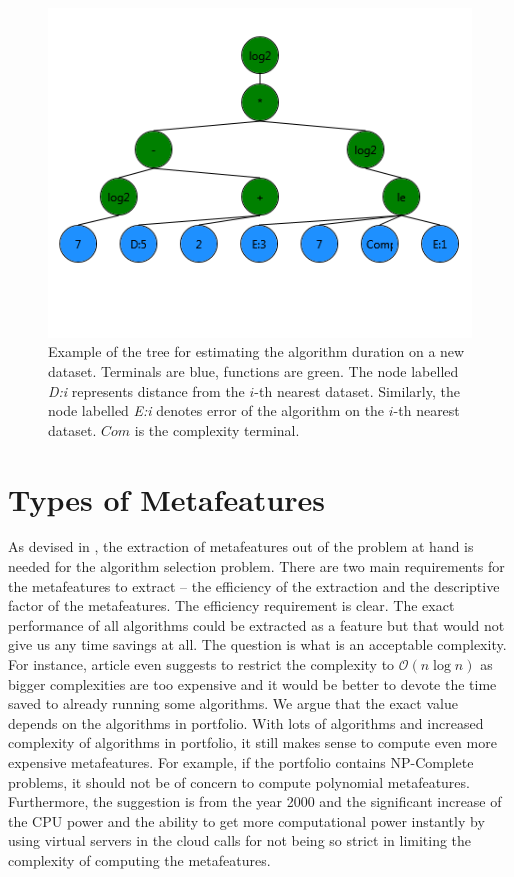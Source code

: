 \begin{figure}
	\includegraphics[width=14cm]{Images/masterThesisTree.png}
	\centering
	\caption{Example of the tree for estimating the algorithm duration on a new dataset. Terminals are blue, functions are green. The node labelled \emph{D:i} represents distance from the $i$-th nearest dataset. Similarly, the node labelled \emph{E:i} denotes error of the algorithm on the $i$-th nearest dataset. $Com$ is the complexity terminal. }
	\label{fig:masterThesisTree}	
\end{figure}

\section{Types of Metafeatures}
As devised in \cite{1976RiceAlgorithmSelectionProblem}, the extraction of metafeatures out of the problem at hand is needed for the algorithm selection problem. There are two main requirements for the metafeatures to extract -- the efficiency of the extraction and the descriptive factor of the metafeatures. The efficiency requirement is clear. The exact performance of all algorithms could be extracted as a feature but that would not give us any time savings at all. The question is what is an acceptable complexity. For instance, article \cite{metafeaturesNlogn} even suggests to restrict the complexity to $\mathcal{O}(n\log n)$ as bigger complexities are too expensive and it would be better to devote the time saved to already running some algorithms. We argue that the exact value depends on the algorithms in portfolio. With lots of algorithms and increased complexity of algorithms in portfolio, it still makes sense to compute even more expensive metafeatures. For example, if the portfolio contains NP-Complete problems, it should not be of concern to compute polynomial metafeatures. Furthermore, the suggestion is from the year 2000 and the significant increase of the CPU power and the ability to get more computational power instantly by using virtual servers in the cloud calls for not being so strict in limiting the complexity of computing the metafeatures. 

